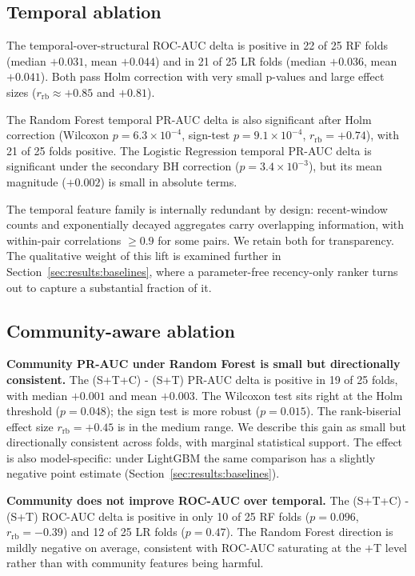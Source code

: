\documentclass[conference]{IEEEtran}
\begin{document}
\subsection{Temporal ablation}\label{sec:results:temporal}

The temporal-over-structural ROC-AUC delta is positive in 22 of 25
RF folds (median $+0.031$, mean $+0.044$) and in 21 of 25 LR folds
(median $+0.036$, mean $+0.041$). Both pass Holm correction with
very small p-values and large effect sizes
($r_{\mathrm{rb}} \approx +0.85$ and $+0.81$).

The Random Forest temporal PR-AUC delta is also significant after
Holm correction (Wilcoxon $p = 6.3\!\times\!10^{-4}$, sign-test
$p = 9.1\!\times\!10^{-4}$, $r_{\mathrm{rb}} = +0.74$), with 21 of
25 folds positive. The Logistic Regression temporal PR-AUC delta is
significant under the secondary BH correction
($p = 3.4\!\times\!10^{-3}$), but its mean magnitude ($+0.002$) is
small in absolute terms.

The temporal feature family is internally redundant by design:
recent-window counts and exponentially decayed aggregates carry
overlapping information, with within-pair correlations $\geq 0.9$
for some pairs. We retain both for transparency. The qualitative
weight of this lift is examined further in
Section~\ref{sec:results:baselines}, where a parameter-free
recency-only ranker turns out to capture a substantial fraction of
it.

\subsection{Community-aware ablation}\label{sec:results:community}

\textbf{Community PR-AUC under Random Forest is small but
directionally consistent.} The (S+T+C) - (S+T) PR-AUC delta is
positive in 19 of 25 folds, with median $+0.001$ and mean $+0.003$.
The Wilcoxon test sits right at the Holm threshold
($p = 0.048$); the sign test is more robust ($p = 0.015$). The
rank-biserial effect size $r_{\mathrm{rb}} = +0.45$ is in the medium
range. We describe this gain as small but directionally consistent
across folds, with marginal statistical support. The effect is also
model-specific: under LightGBM the same comparison has a slightly
negative point estimate (Section~\ref{sec:results:baselines}).

\textbf{Community does not improve ROC-AUC over temporal.} The
(S+T+C) - (S+T) ROC-AUC delta is positive in only 10 of 25 RF folds
($p = 0.096$, $r_{\mathrm{rb}} = -0.39$) and 12 of 25 LR folds
($p = 0.47$). The Random Forest direction is mildly negative on
average, consistent with ROC-AUC saturating at the $+$T level rather
than with community features being harmful.
\end{document}

